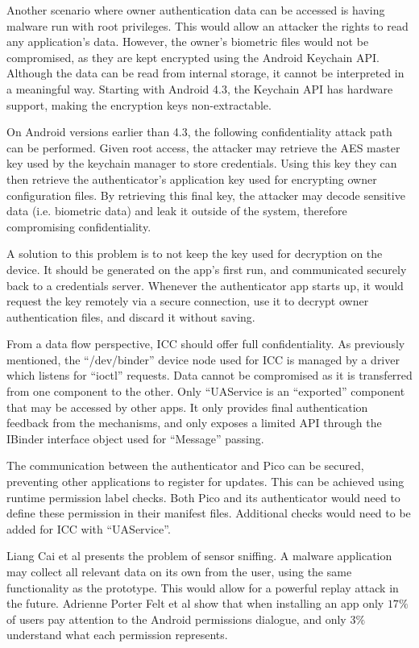 Another scenario where owner authentication data can be accessed is having malware run with root privileges. This would allow an attacker the rights to read any application's data. However, the owner's biometric files would not be compromised, as they are kept encrypted using the Android Keychain API. Although the data can be read from internal storage, it cannot be interpreted in a meaningful way. Starting with Android 4.3, the Keychain API has hardware support, making the encryption keys non-extractable. 

On Android versions earlier than 4.3, the following confidentiality attack path can be performed. Given root access, the attacker may retrieve the AES master key used by the keychain manager to store credentials. Using this key they can then retrieve the authenticator's application key used for encrypting owner configuration files. By retrieving this final key, the attacker may decode sensitive data (i.e. biometric data) and leak it outside of the system, therefore compromising confidentiality.

A solution to this problem is to not keep the key used for decryption on the device. It should be generated on the app's first run, and communicated securely back to a credentials server. Whenever the authenticator app starts up, it would request the key remotely via a secure connection, use it to decrypt owner authentication files, and discard it without saving.

From a data flow perspective, ICC should offer full confidentiality. As previously mentioned, the ``/dev/binder'' device node used for ICC is managed by a driver which listens for ``ioctl'' requests. Data cannot be compromised as it is transferred from one component to the other. Only ``UAService is an ``exported'' component that may be accessed by other apps. It only provides final authentication feedback from the mechanisms, and only exposes a limited API through the IBinder interface object used for ``Message'' passing.

The communication between the authenticator and Pico can be secured, preventing other applications to register for updates. This can be achieved using runtime permission label checks. Both Pico and its authenticator would need to define these permission in their manifest files. Additional checks would need to be added for ICC with ``UAService''.

Liang Cai et al \cite{cai2009defending} presents the problem of sensor sniffing. A malware application may collect all relevant data on its own from the user, using the same functionality as the prototype. This would allow for a powerful replay attack in the future. Adrienne Porter Felt et al \cite{felt2012android} show that when installing an app only $17\%$ of users pay attention to the Android permissions dialogue, and only $3\%$ understand what each permission represents.

